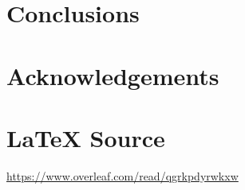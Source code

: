 \documentclass{article}
\theoremstyle{definition}
\begin{document}
%
%
%
%
%
%
%
%	
%
%
%
%
\section{Conclusions}
\label{sec:conclusions}
%
%
%
\section{Acknowledgements}
\label{sec:acknowledgements}
%
%
\section*{\LaTeX \hspace{0.025 mm} Source}
\url{https://www.overleaf.com/read/qgrkpdyrwkxw}
%
%
%


%
%
%
%
%
\end{document}
